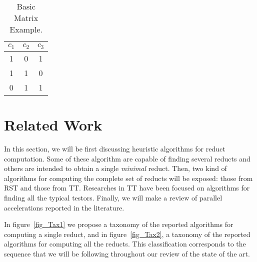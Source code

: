 \documentclass[authoryear,11pt]{elsarticle}
\begin{document}
     \begin{table}[htb]
		\caption{Basic Matrix Example.} \label{tab_SDM}
		\centering
 	\begin{tabular}{ccc}
 		$c_1$ & $c_2$ & $c_3$\\
 		\hline
		1 & 0 & 1 \\
		1 & 1 & 0 \\
		0 & 1 & 1
 	\end{tabular}             
 \end{table}

\section{Related Work}\label{relatedWork}
  In this section, we will be first discussing heuristic algorithms for reduct computation. Some of these 
  algorithm are capable of finding several reducts and others are intended to obtain a single \textit{minimal} 
  reduct. Then, two kind of algorithms for computing the complete set of reducts will be exposed: those 
  from RST and those from TT. Researches in TT have been focused on algorithms for finding all the typical 
  testors. Finally, we will make a review of parallel accelerations reported in the literature.  
  
  In figure~\ref{fig_Tax1} we propose a taxonomy of the reported algorithms for computing a single reduct,
  and in figure~\ref{fig_Tax2}, a taxonomy of the reported algorithms for computing all the reducts. 
  This classification corresponds to the sequence that we will be following throughout our review of the 
  state of the art.
   
\end{document}
